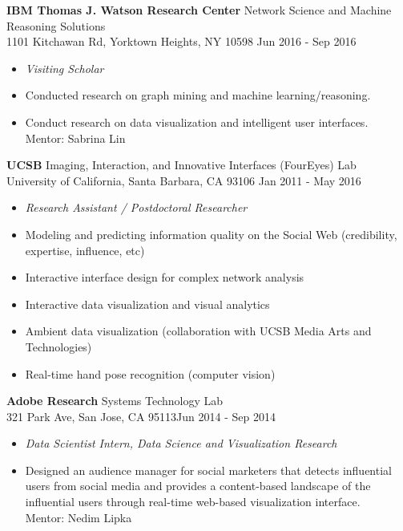 \documentclass[10pt]{article}
\newenvironment{innerlist}[1][\enskip\textbullet]%
        {\begin{itemize}[#1,leftmargin=*,parsep=0pt,itemsep=0pt,topsep=0pt,partopsep=0pt]}
        {\end{itemize}}
\begin{document}
\textbf{IBM Thomas J. Watson Research Center} \hfill {Network Science and Machine Reasoning Solutions}\\1101 Kitchawan Rd, Yorktown Heights, NY 10598 \hfill {Jun 2016 - Sep 2016}
\begin{innerlist}
\item[] \emph{Visiting Scholar}
   \item[--] Conducted research on graph mining and machine learning/reasoning.
   \item[--] Conduct research on data visualization and intelligent user interfaces.\\
   Mentor: Sabrina Lin\\
\end{innerlist}
%
\textbf{UCSB} \hfill{Imaging, Interaction, and Innovative Interfaces (FourEyes) Lab}\\
University of California, Santa Barbara, CA 93106 \hfill {Jan 2011 - May 2016}
\begin{innerlist}
\item[] \emph{Research Assistant / Postdoctoral Researcher}
   \item[--] Modeling and predicting information quality on the Social Web (credibility, expertise, influence, etc)
   \item[--] Interactive interface design for complex network analysis
   \item[--] Interactive data visualization and visual analytics
   \item[--] Ambient data visualization (collaboration with UCSB Media Arts and Technologies)
   \item[--] Real-time hand pose recognition (computer vision)\\
\end{innerlist}
%
\textbf{Adobe Research} \hfill{Systems Technology Lab}\\
321 Park Ave, San Jose, CA 95113\hfill {Jun 2014 - Sep 2014}
\begin{innerlist}
\item[] \emph{Data Scientist Intern, Data Science and Visualization Research}
   \item[--] Designed an audience manager for social marketers that detects influential users from social media and provides a content-based landscape of the influential users through real-time web-based visualization interface.\\ 
   Mentor: Nedim Lipka\\
\end{innerlist}
%
\end{document}
